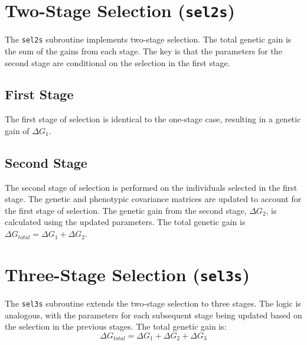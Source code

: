 \documentclass{article}
\begin{document}
\section{Two-Stage Selection (\texttt{sel2s})}
The \texttt{sel2s} subroutine implements two-stage selection. The total genetic gain is the sum of the gains from each stage. The key is that the parameters for the second stage are conditional on the selection in the first stage.

\subsection{First Stage}
The first stage of selection is identical to the one-stage case, resulting in a genetic gain of $\Delta G_1$.

\subsection{Second Stage}
The second stage of selection is performed on the individuals selected in the first stage. The genetic and phenotypic covariance matrices are updated to account for the first stage of selection. The genetic gain from the second stage, $\Delta G_2$, is calculated using the updated parameters. The total genetic gain is $\Delta G_{total} = \Delta G_1 + \Delta G_2$.

\section{Three-Stage Selection (\texttt{sel3s})}
The \texttt{sel3s} subroutine extends the two-stage selection to three stages. The logic is analogous, with the parameters for each subsequent stage being updated based on the selection in the previous stages. The total genetic gain is:
\begin{equation}
\Delta G_{total} = \Delta G_1 + \Delta G_2 + \Delta G_3
\end{equation}
\end{document}
